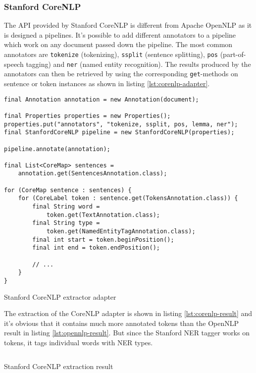 \newpage
\subsubsection{Stanford CoreNLP}
The \gls{API} provided by Stanford CoreNLP is different from Apache OpenNLP as it is designed a pipelines. It's possible to add different annotators to a pipeline which work on any document passed down the pipeline. The most common annotators are \texttt{tokenize} (tokenizing), \texttt{ssplit} (sentence splitting), \texttt{pos} (part-of-speech tagging) and \texttt{ner} (named entity recognition). The results produced by the annotators can then be retrieved by using the corresponding \texttt{get}-methods on sentence or token instances as shown in listing \ref{lst:corenlp-adapter}.

\begin{listing}[H]
\begin{verbatim}
final Annotation annotation = new Annotation(document);

final Properties properties = new Properties();
properties.put("annotators", "tokenize, ssplit, pos, lemma, ner");
final StanfordCoreNLP pipeline = new StanfordCoreNLP(properties);

pipeline.annotate(annotation);

final List<CoreMap> sentences = 
    annotation.get(SentencesAnnotation.class);

for (CoreMap sentence : sentences) {
    for (CoreLabel token : sentence.get(TokensAnnotation.class)) {
        final String word = 
            token.get(TextAnnotation.class);
        final String type = 
            token.get(NamedEntityTagAnnotation.class);
        final int start = token.beginPosition();
        final int end = token.endPosition();

        // ...
    }
}
\end{verbatim}
\caption{Stanford CoreNLP extractor adapter}
\label{lst:corenlp-adapter}
\end{listing}

\newpage
The extraction of the CoreNLP adapter is shown in listing \ref{lst:corenlp-result} and it's obvious that it contains much more annotated tokens than the OpenNLP result in listing \ref{lst:opennlp-result}. But since the Stanford \gls{NER} tagger works on tokens, it tags individual words with \gls{NER} types.

\begin{listing}[H]
\inputminted{xml}{corenlp.xml}
\caption{Stanford CoreNLP extraction result}
\label{lst:corenlp-result}
\end{listing}

